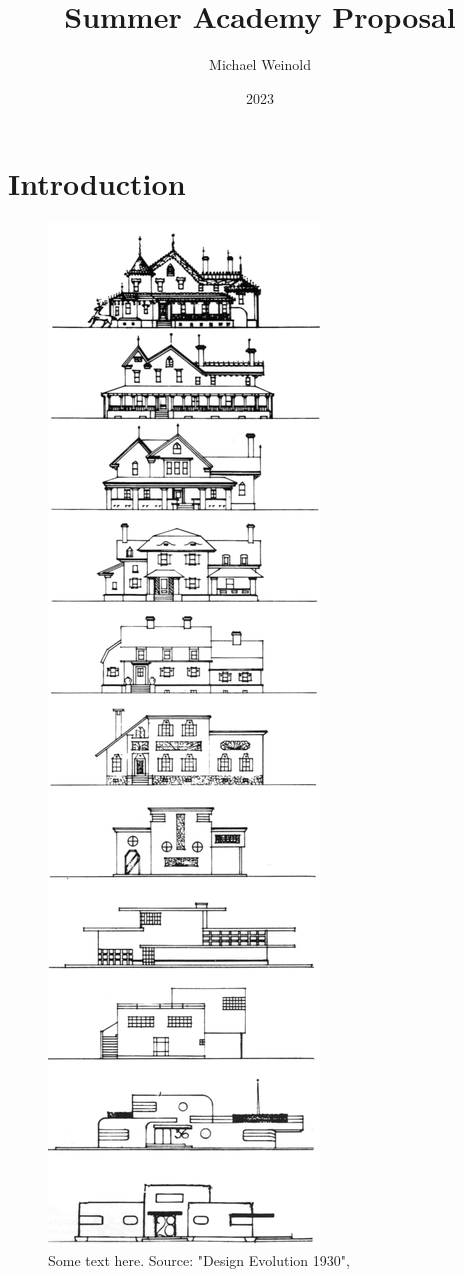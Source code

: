 \documentclass{article}
\title{Summer Academy Proposal}
\author{Michael Weinold}
\date{2023}
\begin{document}
\maketitle

\section{Introduction}

\begin{figure}[]
    \centering
    \includegraphics[height=\textheight]{./figures/loewy_architecture.png}
    \caption{
        Some text here. Source: "Design Evolution 1930", \cite{loewy_industrial_1979}
    }
    \label{fig:combined}
\end{figure}

\newpage
\printbibliography
\end{document}
